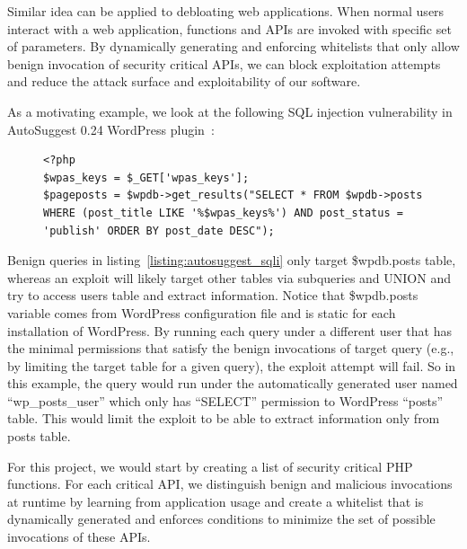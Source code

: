 Similar idea can be applied to debloating web applications. When normal users interact with a web application, functions and APIs are invoked with specific set of parameters. By dynamically generating and enforcing whitelists that only allow benign invocation of security critical APIs, we can block exploitation attempts and reduce the attack surface and exploitability of our software.

As a motivating example, we look at the following SQL injection vulnerability in AutoSuggest 0.24 WordPress plugin~\cite{autosuggest_vulnerability}:

\begin{figure}[t]
\begin{lstlisting}[frame=single, caption={PHP code from AutoSuggest WordPress plugin with SQL injection vulnerability},captionpos=b, label={listing:autosuggest_sqli}]
<?php
$wpas_keys = $_GET['wpas_keys'];
$pageposts = $wpdb->get_results("SELECT * FROM $wpdb->posts
WHERE (post_title LIKE '%$wpas_keys%') AND post_status = 'publish' ORDER BY post_date DESC");
\end{lstlisting}
\end{figure}

Benign queries in listing~\ref{listing:autosuggest_sqli} only target \$wpdb.posts table, whereas an exploit will likely target other tables via subqueries and UNION and try to access users table and extract information. Notice that \$wpdb.posts variable comes from WordPress configuration file and is static for each installation of WordPress.
By running each query under a different user that has the minimal permissions that satisfy the benign invocations of target query (e.g., by limiting the target table for a given query), the exploit attempt will fail.
So in this example, the query would run under the automatically generated user named ``wp\_posts\_user'' which only has ``SELECT'' permission to WordPress ``posts'' table. This would limit the exploit to be able to extract information only from posts table.

For this project, we would start by creating a list of security critical PHP functions.
For each critical API, we distinguish benign and malicious invocations at runtime by learning from application usage and create a whitelist that is dynamically generated and enforces conditions to minimize the set of possible invocations of these APIs.

